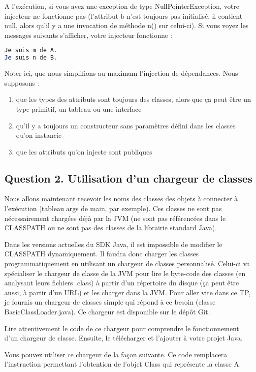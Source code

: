 \documentclass[11pt]{article}
\begin{document}
A l'exécution, si vous avez une exception de type
NullPointerException, votre injecteur ne fonctionne pas (l'attribut b
n'est toujours pas initialisé, il contient null, alors qu'il y a une
invocation de méthode n() sur celui-ci). Si vous voyez les messages
suivants s'afficher, votre injecteur fonctionne :
\begin{lstlisting}[language=Java,basicstyle=\scriptsize]
Je suis m de A.
Je suis n de B.
\end{lstlisting}

Noter ici, que nous simplifions au maximum l'injection de
dépendances. Nous supposons :
\begin{enumerate}
\item que les types des attributs sont toujours des classes, alors que
  ça peut être un type primitif, un tableau ou une interface
\item qu'il y a toujours un constructeur sans paramètres défini dans
  les classes qu'on instancie
\item que les attributs qu'on injecte sont publiques
\end{enumerate}

\subsection*{Question 2. \small{Utilisation d'un chargeur de classes}}
Nous allons maintenant recevoir les noms des classes des objets à
connecter à l'exécution (tableau args de main, par exemple). Ces
classes ne sont pas nécessairement chargées déjà par la JVM (ne sont
pas référencées dans le CLASSPATH ou ne sont pas des classes de la
librairie standard Java).

Dans les versions actuelles du SDK Java, il est impossible de modifier
le CLASSPATH dynamiquement. Il faudra donc charger les classes
programmatiquement en utilisant un chargeur de classes
personnalisé. Celui-ci va spécialiser le chargeur de classe de la JVM
pour lire le byte-code des classes (en analysant leurs fichiers
.class) à partir d'un répertoire du disque (ça peut être aussi, à
partir d'un URL) et les charger dans la JVM.  Pour aller vite dans ce
TP, je fournis un chargeur de classes simple qui répond à ce besoin
(classe BasicClassLoader.java). Ce chargeur est disponible sur le dépôt Git.

Lire attentivement le code de ce chargeur pour comprendre le
fonctionnement d'un chargeur de classe. Ensuite, le télécharger et
l'ajouter à votre projet Java.

Vous pouvez utiliser ce chargeur de la façon suivante. Ce code
remplacera l'instruction permettant l'obtention de l'objet Class qui
représente la classe A.
\end{document}
